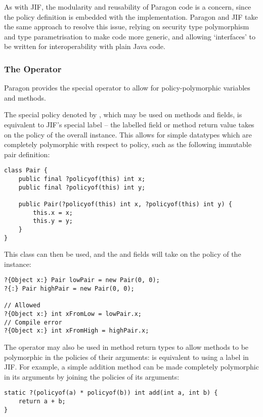 As with JIF, the modularity and reusability of Paragon code is a concern, since the policy definition is embedded with the implementation. Paragon and JIF take the same approach to resolve this issue, relying on security type polymorphism and type parametrisation to make code more generic, and allowing `interfaces' to be written for interoperability with plain Java code.

\subsubsection{The  Operator}

Paragon provides the special  operator to allow for policy-polymorphic variables and methods.

The special policy denoted by , which may be used on methods and  fields, is equivalent to JIF's special  label -- the labelled field or method return value takes on the policy of the overall instance. This allows for simple datatypes which are completely polymorphic with respect to policy, such as the following immutable pair definition:

\begin{verbatim}
class Pair {
	public final ?policyof(this) int x;
	public final ?policyof(this) int y;
	
	public Pair(?policyof(this) int x, ?policyof(this) int y) {
		this.x = x;
		this.y = y;
	} 
}
\end{verbatim}

This class can then be used, and the  and  fields will take on the policy of the instance:

\begin{verbatim}
?{Object x:} Pair lowPair = new Pair(0, 0);
?{:} Pair highPair = new Pair(0, 0);

// Allowed
?{Object x:} int xFromLow = lowPair.x;
// Compile error
?{Object x:} int xFromHigh = highPair.x;
\end{verbatim}

The  operator may also be used in method return types to allow methods to be polymorphic in the policies of their arguments:  is equivalent to using a  label in JIF. For example, a simple addition method can be made completely polymorphic in its arguments by joining the policies of its arguments:

\begin{verbatim}
static ?(policyof(a) * policyof(b)) int add(int a, int b) {
	return a + b;
}
\end{verbatim}

